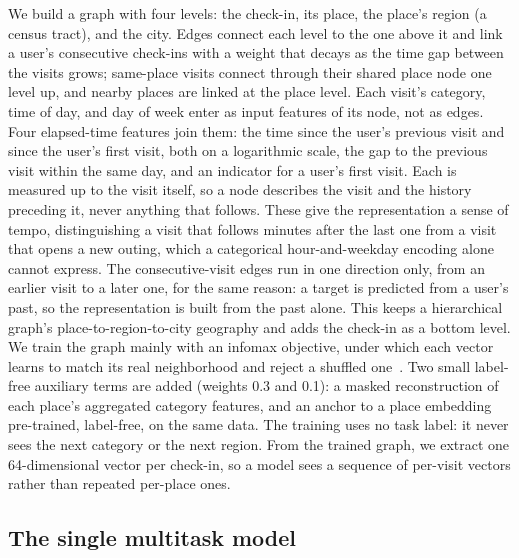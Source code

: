 We build a graph with four levels: the check-in, its place, the place's region (a census tract), and the city. Edges connect each level to the one above it and link a user's consecutive check-ins with a weight that decays as the time gap between the visits grows; same-place visits connect through their shared place node one level up, and nearby places are linked at the place level. Each visit's category, time of day, and day of week enter as input features of its node, not as edges. Four elapsed-time features join them: the time since the user's previous visit and since the user's first visit, both on a logarithmic scale, the gap to the previous visit within the same day, and an indicator for a user's first visit. Each is measured up to the visit itself, so a node describes the visit and the history preceding it, never anything that follows. These give the representation a sense of tempo, distinguishing a visit that follows minutes after the last one from a visit that opens a new outing, which a categorical hour-and-weekday encoding alone cannot express. The consecutive-visit edges run in one direction only, from an earlier visit to a later one, for the same reason: a target is predicted from a user's past, so the representation is built from the past alone. This keeps a hierarchical graph's place-to-region-to-city geography and adds the check-in as a bottom level. We train the graph mainly with an infomax objective, under which each vector learns to match its real neighborhood and reject a shuffled one~\cite{velickovic2019deep,huang2023hgi}. Two small label-free auxiliary terms are added (weights 0.3 and 0.1): a masked reconstruction of each place's aggregated category
features, and an anchor to a place embedding pre-trained, label-free,
on the same data. The training
uses no task label: it
never sees the next category or the next region. From the trained graph, we extract one 64-dimensional vector per check-in, so a model sees a sequence of per-visit vectors rather than repeated per-place ones.

\subsection{The single multitask model}
\label{sec:mobiwac:method-model}

